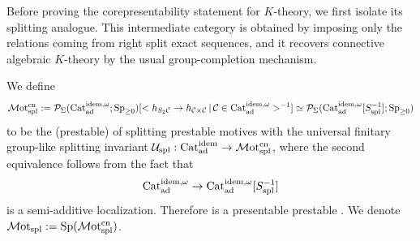 \documentclass[a4paper,10pt, oneside]{amsart}
\begin{document}
Before proving the corepresentability statement for $K$-theory, we
first isolate its splitting analogue.  This intermediate category is obtained
by imposing only the relations coming from right split exact sequences, and it
recovers connective algebraic $K$-theory by the usual group-completion
mechanism.
\begin{de}
	We define $$\mathcal{M}\mathrm{ot}_{\mathrm{spl}}^{\mathrm{cn}}:= \mathcal{P}_{\Sigma}(\mathrm{Cat}_{\mathrm{ad}}^{\mathrm{idem},\omega};\operatorname{Sp}_{\geq0})[< h_{S_2\mathcal{C}} \to h_{\mathcal{C}\times\mathcal{C}}\,|\,\mathcal{C}\in \mathrm{Cat}_{\mathrm{ad}}^{\mathrm{idem},\omega}>^{-1} ]\simeq \mathcal{P}_{\Sigma}(\mathrm{Cat}_{\mathrm{ad}}^{\mathrm{idem},\omega}[S_{\mathrm{spl}}^{-1}];\operatorname{Sp}_{\geq0})$$ to be the (prestable) \infcat of splitting prestable motives with the universal finitary group-like splitting invariant $\mathcal{U}_{\mathrm{spl}}:\mathrm{Cat}_{\mathrm{ad}}^{\mathrm{idem}}\to\mathcal{M}\mathrm{ot}_{\mathrm{spl}}^{\mathrm{cn}}$, where the second equivalence follows from the fact that $$\mathrm{Cat}_{\mathrm{ad}}^{\mathrm{idem},\omega}\to\mathrm{Cat}_{\mathrm{ad}}^{\mathrm{idem},\omega}[S_{\mathrm{spl}}^{-1}]$$ is a semi-additive localization. Therefore \motsplcn  is a presentable prestable \infcat. We denote $\mathcal{M}\mathrm{ot}_{\mathrm{spl}}:=\mathrm{Sp}(\mathcal{M}\mathrm{ot}_{\mathrm{spl}}^{\mathrm{cn}})$.
\end{de}
\end{document}
